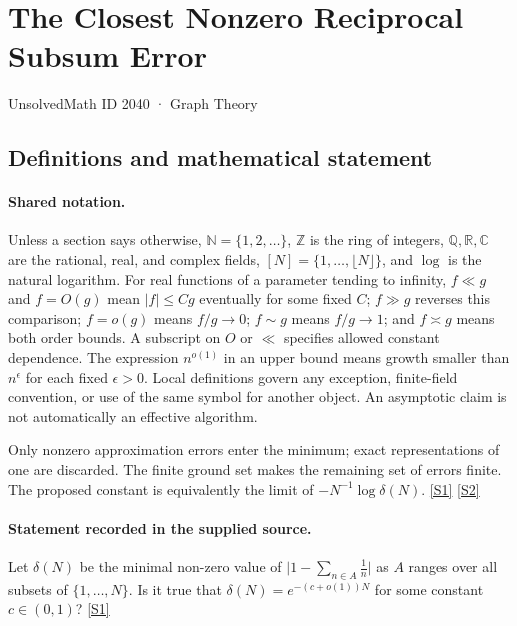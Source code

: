\documentclass[11pt,a4paper]{article}
\newcommand{\N}{\mathbb{N}}
\newcommand{\Z}{\mathbb{Z}}
\newcommand{\Q}{\mathbb{Q}}
\newcommand{\R}{\mathbb{R}}
\newcommand{\C}{\mathbb{C}}
\newcommand{\sref}[2]{\hyperlink{source:#1:#2}{[S#2]}}
\begin{document}

\setcounter{section}{2039}

\section{The Closest Nonzero Reciprocal Subsum Error}\label{2040}

{\small\sffamily UnsolvedMath ID 2040 · Graph Theory}

\subsection{Definitions and mathematical statement}

\paragraph{Shared notation.}Unless a section says otherwise, $\N=\{1,2,\ldots\}$,
$\Z$ is the ring of integers, $\Q,\R,\C$ are the rational, real, and complex
fields, $[N]=\{1,\ldots,\lfloor N\rfloor\}$, and $\log$ is the natural
logarithm. For real functions of a parameter tending to infinity,
$f\ll g$ and $f=O(g)$ mean $|f|\leq Cg$ eventually for some fixed $C$;
$f\gg g$ reverses this comparison; $f=o(g)$ means $f/g\to0$;
$f\sim g$ means $f/g\to1$; and $f\asymp g$ means both order bounds.
A subscript on $O$ or $\ll$ specifies allowed constant dependence.
The expression $n^{o(1)}$ in an upper bound means growth smaller than
$n^\epsilon$ for each fixed $\epsilon>0$. Local definitions govern any
exception, finite-field convention, or use of the same symbol for another
object. An asymptotic claim is not automatically an effective algorithm.



Only nonzero approximation errors enter the minimum; exact representations of one are discarded. The finite ground set makes the remaining set of errors finite. The proposed constant is equivalently the limit of $-N^{-1}\log\delta(N)$. \sref{2040}{1} \sref{2040}{2}

\paragraph{Statement recorded in the supplied source.}
Let $\delta(N)$ be the minimal non-zero value of $\lvert 1-\sum_{n\in A}\frac{1}{n}\rvert$ as $A$ ranges over all subsets of $\{1,\ldots,N\}$. Is it true that $ \delta(N)=e^{-(c+o(1))N} $ for some constant $c\in (0,1)$? \sref{2040}{1}
\end{document}
